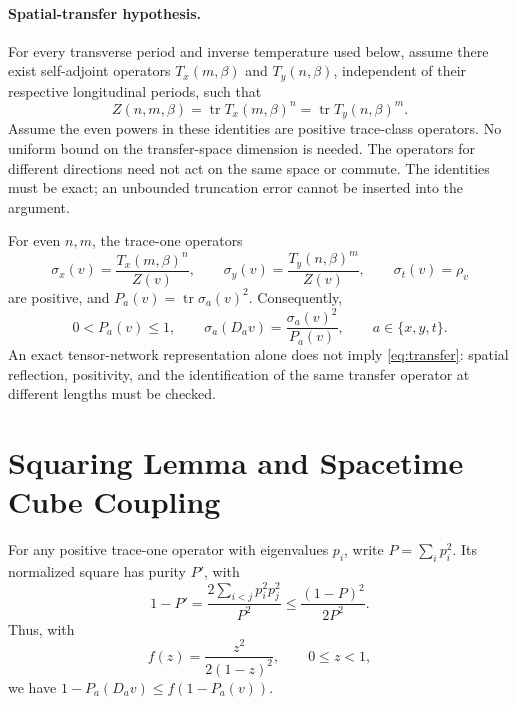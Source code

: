 \documentclass[11pt]{article}
\newcommand{\tr}{\operatorname{tr}}
\begin{document}
\paragraph{Spatial-transfer hypothesis.}
For every transverse period and inverse temperature used below, assume
there exist self-adjoint operators \(T_x(m,\beta)\) and
\(T_y(n,\beta)\), independent of their respective longitudinal periods,
such that
\begin{equation}
	Z(n,m,\beta)=\tr T_x(m,\beta)^n
	=\tr T_y(n,\beta)^m.
	\label{eq:transfer}
\end{equation}
Assume the even powers in these identities are positive trace-class
operators. No uniform bound on the transfer-space dimension is needed.
The operators for different directions need not act on the same space
or commute. The identities must be exact; an unbounded truncation error
cannot be inserted into the argument.

For even \(n,m\), the trace-one operators
\[
	\sigma_x(v)=\frac{T_x(m,\beta)^n}{Z(v)},\qquad
	\sigma_y(v)=\frac{T_y(n,\beta)^m}{Z(v)},\qquad
	\sigma_t(v)=\rho_v
\]
are positive, and \(P_a(v)=\tr\sigma_a(v)^2\). Consequently,
\begin{equation}
	0<P_a(v)\le1,\qquad
	\sigma_a(D_av)=\frac{\sigma_a(v)^2}{P_a(v)},
	\qquad a\in\{x,y,t\}.
	\label{eq:square-states}
\end{equation}
An exact tensor-network representation alone does not imply
\eqref{eq:transfer}: spatial reflection, positivity, and the identification
of the same transfer operator at different lengths must be checked.

\section{Squaring Lemma and Spacetime Cube Coupling}

For any positive trace-one operator with eigenvalues \(p_i\), write
\(P=\sum_i p_i^2\). Its normalized square has purity \(P'\), with
\[
	1-P'=\frac{2\sum_{i<j}p_i^2p_j^2}{P^2}
	\le\frac{(1-P)^2}{2P^2}.
\]
Thus, with
\begin{equation}
	f(z)=\frac{z^2}{2(1-z)^2},\qquad 0\le z<1,
	\label{eq:f}
\end{equation}
we have \(1-P_a(D_av)\le f(1-P_a(v))\).
\end{document}
